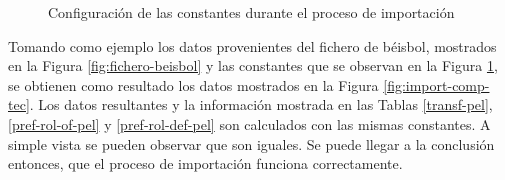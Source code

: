 \begin{figure} [H]
	\centering
	
	\caption{Configuración de las constantes durante el proceso de importación} \label{fig:conf-constantes}
\end{figure}

Tomando como ejemplo los datos provenientes del fichero de béisbol, mostrados en la Figura \ref{fig:fichero-beisbol} y las constantes que se observan en la Figura \ref{fig:conf-constantes}, se obtienen como resultado los datos mostrados en la Figura \ref{fig:import-comp-tec}. Los datos resultantes y la información mostrada en las Tablas \ref{transf-pel}, \ref{pref-rol-of-pel} y \ref{pref-rol-def-pel} son calculados con las mismas constantes. A simple vista se pueden observar que son iguales. Se puede llegar a la conclusión entonces, que el proceso de importación funciona correctamente. 

